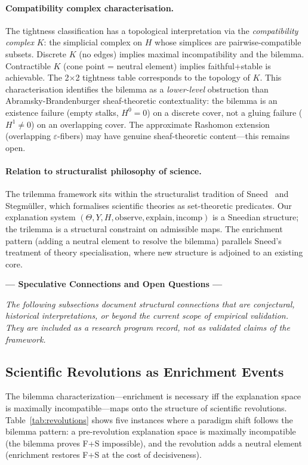 \documentclass[11pt,a4paper]{article}
\begin{document}
\paragraph{Compatibility complex characterisation.}
The tightness classification has a topological interpretation via the \emph{compatibility complex} $K$: the simplicial complex on $H$ whose simplices are pairwise-compatible subsets. Discrete $K$ (no edges) implies maximal incompatibility and the bilemma. Contractible $K$ (cone point = neutral element) implies faithful+stable is achievable. The 2$\times$2 tightness table corresponds to the topology of $K$. This characterisation identifies the bilemma as a \emph{lower-level} obstruction than Abramsky-Brandenburger sheaf-theoretic contextuality: the bilemma is an existence failure (empty stalks, $H^0 = 0$) on a discrete cover, not a gluing failure ($H^1 \neq 0$) on an overlapping cover. The approximate Rashomon extension (overlapping $\varepsilon$-fibers) may have genuine sheaf-theoretic content---this remains open.

\paragraph{Relation to structuralist philosophy of science.}
The trilemma framework sits within the structuralist tradition of Sneed~\cite{sneed1971logical} and Stegm\"uller, which formalises scientific theories as set-theoretic predicates. Our explanation system $(\Theta, Y, H, \text{observe}, \text{explain}, \text{incomp})$ is a Sneedian structure; the trilemma is a structural constraint on admissible maps. The enrichment pattern (adding a neutral element to resolve the bilemma) parallels Sneed's treatment of theory specialisation, where new structure is adjoined to an existing core.

\bigskip
\noindent\textbf{--- Speculative Connections and Open Questions ---}

\medskip
\noindent\emph{The following subsections document structural connections that
are conjectural, historical interpretations, or beyond the current scope
of empirical validation.  They are included as a research program record,
not as validated claims of the framework.}

\subsection{Scientific Revolutions as Enrichment Events}
\label{sec:revolutions}

The bilemma characterization---enrichment is necessary iff the explanation
space is maximally incompatible---maps onto the structure of scientific
revolutions. Table~\ref{tab:revolutions} shows five instances where a
paradigm shift follows the bilemma pattern: a pre-revolution explanation
space is maximally incompatible (the bilemma proves F+S impossible), and the
revolution adds a neutral element (enrichment restores F+S at the cost
of decisiveness).
\end{document}
